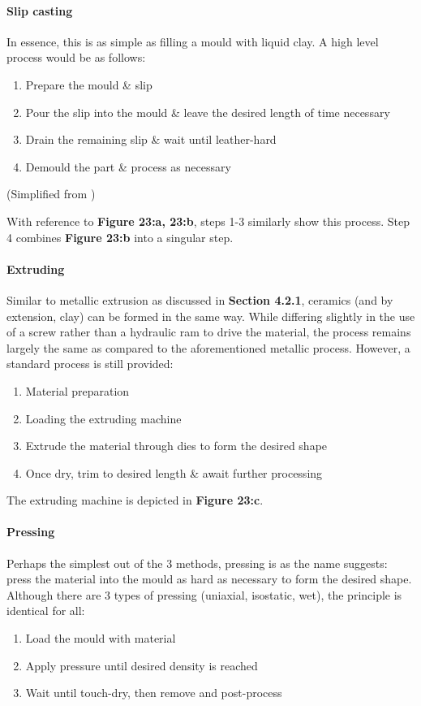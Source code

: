 \documentclass[../main.tex]{subfiles}
\begin{document}
\paragraph{Slip casting}
In essence, this is as simple as filling a mould with liquid clay.
A high level process would be as follows:
\begin{enumerate}
	\item Prepare the mould \& slip
	\item Pour the slip into the mould \& leave the desired length of time necessary
	\item Drain the remaining slip \& wait until leather-hard
	\item Demould the part \& process as necessary
\end{enumerate}
(Simplified from \textcite{slipcast, slipcast2})

With reference to \textbf{Figure 23:a, 23:b}, steps 1-3 similarly show this process. Step 4 combines \textbf{Figure 23:b} into a singular step.

\paragraph{Extruding}
Similar to metallic extrusion as discussed in \textbf{Section 4.2.1}, ceramics (and by extension, clay) can be formed in the same way.
While differing slightly in the use of a screw rather than a hydraulic ram to drive the material, the process remains largely the same as compared to the aforementioned metallic process.
However, a standard process is still provided:
\begin{enumerate}
	\item Material preparation
	\item Loading the extruding machine
	\item Extrude the material through dies to form the desired shape
	\item Once dry, trim to desired length \& await further processing
\end{enumerate}

The extruding machine is depicted in \textbf{Figure 23:c}.

\paragraph{Pressing}
Perhaps the simplest out of the 3 methods, pressing is as the name suggests: press the material into the mould as hard as necessary to form the desired shape.
Although there are 3 types of pressing (uniaxial, isostatic, wet), the principle is identical for all:
\begin{enumerate}
	\item Load the mould with material
	\item Apply pressure until desired density is reached
	\item Wait until touch-dry, then remove and post-process
\end{enumerate}
\end{document}
